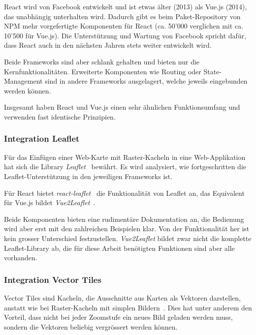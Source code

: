 React wird von Facebook entwickelt und ist etwas älter (2013) als Vue.js (2014), das unabhängig unterhalten wird.
Dadurch gibt es beim Paket-Repository von NPM mehr vorgefertigte Komponenten für React (ca. 50'000 verglichen mit ca. 10'500 für Vue.js).
Die Unterstützung und Wartung von Facebook spricht dafür, dass React auch in den nächsten Jahren stets weiter entwickelt wird.

Beide Frameworks sind aber schlank gehalten und bieten nur die Kernfunktionalitäten.
Erweiterte Komponenten wie Routing oder State-Management sind in andere Frameworks ausgelagert, welche jeweils eingebunden werden können.

Insgesamt haben React und Vue.js einen sehr ähnlichen Funktionsumfang und verwenden fast identische Prinzipien.

\subsubsection{Integration Leaflet}
\label{Analyse Framework:Integration Leaflet}

Für das Einfügen einer Web-Karte mit Raster-Kacheln in eine Web-Applikation hat sich die Library \emph{Leaflet}~\cite{leaflet} bewährt.
Es wird analysiert, wie fortgeschritten die Leaflet-Unterstützung in den jeweiligen Frameworks ist.

Für React bietet \emph{react-leaflet}~\cite{react-leaflet} die Funktionalität von Leaflet an, das Equivalent für Vue.js bildet \emph{Vue2Leaflet}~\cite{vue2leaflet}.

Beide Komponenten bieten eine rudimentäre Dokumentation an, die Bedienung wird aber erst mit den zahlreichen Beispielen klar.
Von der Funktionalität her ist kein grosser Unterschied festzustellen.
\emph{Vue2Leaflet} bildet zwar nicht die komplette Leaflet-Library ab, die für diese Arbeit benötigten Funktionen sind aber alle vorhanden.


\subsubsection{Integration Vector Tiles}
\label{Analyse Framework:Integration Vector Tiles}

Vector Tiles sind Kacheln, die Ausschnitte aus Karten als Vektoren darstellen, anstatt wie bei Raster-Kacheln mit simplen Bildern~\cite{geometalab_vectortiles}.
Dies hat unter anderem den Vorteil, dass nicht bei jeder Zoomstufe ein neues Bild geladen werden muss, sondern die Vektoren beliebig vergrössert werden können.

